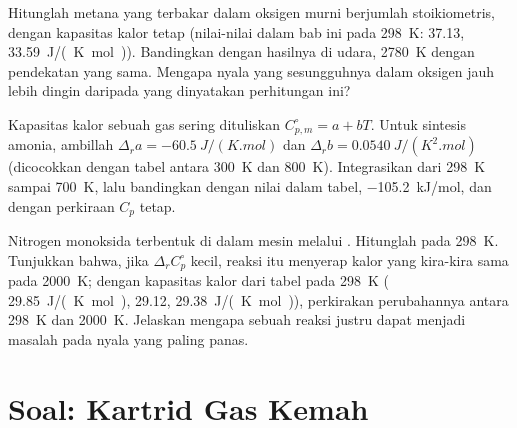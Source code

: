 \begin{exercise}[$\star\star\star$]\label{exo:b2:reaction-enthalpy:10}
Hitunglah  metana yang terbakar dalam oksigen murni
berjumlah stoikiometris, dengan kapasitas kalor tetap (nilai-nilai dalam
bab ini pada \qty{298}{K}:  37.13, 
\qty{33.59}{J/(K.mol)}). Bandingkan dengan hasilnya di udara,
\qty{2780}{K} dengan pendekatan yang sama. Mengapa nyala yang sesungguhnya
dalam oksigen jauh lebih dingin daripada yang dinyatakan perhitungan ini?
\end{exercise}

\begin{exercise}[$\star\star\star$]\label{exo:b2:reaction-enthalpy:11}
Kapasitas kalor sebuah gas sering dituliskan $C_{p,m}^\circ = a + bT$.
Untuk sintesis amonia, ambillah $\Delta_r a = \qty{-60.5}{J/(K.mol)}$ dan
$\Delta_r b = \qty{0.0540}{J/(K^2.mol)}$ (dicocokkan dengan tabel antara
\qty{300}{K} dan \qty{800}{K}). Integrasikan  dari
\qty{298}{K} sampai \qty{700}{K}, lalu bandingkan dengan nilai dalam
tabel, \qty{-105.2}{kJ/mol}, dan dengan perkiraan $C_p$ tetap.
\end{exercise}

\begin{exercise}[$\star\star\star$]\label{exo:b2:reaction-enthalpy:12}
Nitrogen monoksida terbentuk di dalam mesin melalui
. Hitunglah  pada
\qty{298}{K}. Tunjukkan bahwa, jika $\Delta_r C_p^\circ$ kecil, reaksi
itu menyerap kalor yang kira-kira sama pada \qty{2000}{K}; dengan
kapasitas kalor dari tabel pada \qty{298}{K} (
\qty{29.85}{J/(K.mol)},  29.12,  \qty{29.38}{J/(K.mol)}),
perkirakan perubahannya antara \qty{298}{K} dan \qty{2000}{K}. Jelaskan
mengapa sebuah reaksi  justru dapat menjadi masalah pada nyala
yang paling panas.
\end{exercise}

\section{Soal: Kartrid Gas Kemah}

